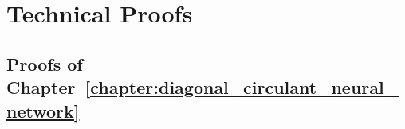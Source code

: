 \chapter{Technical Proofs}
\label{chapter_appendix:technical_proofs}
\localtableofcontents

\section{Proofs of Chapter~\ref{chapter:diagonal_circulant_neural_network}}


